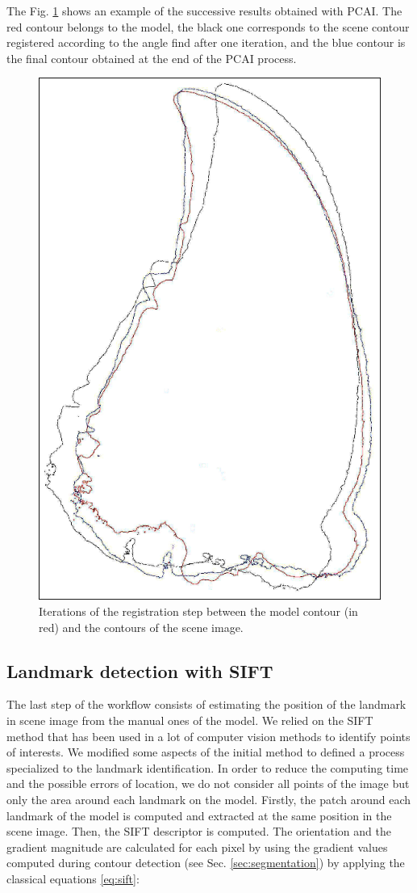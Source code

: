 \documentclass[twoside,twocolumn,10pt]{article}
\begin{document}
The Fig. \ref{fig:box} shows an example of the successive results obtained with PCAI.
The red contour belongs to the model, the black one corresponds to the scene contour registered according to the angle find after one iteration, and the blue contour is the
final contour obtained at the end of the PCAI process.

\begin{figure}[htbp]
    \centering
    \includegraphics[width=.265\textwidth]{./images/imreg}
    \caption{Iterations of the registration step between the model contour (in red) and the contours of the scene image.}
    \label{fig:box}
\end{figure}

\subsection{Landmark detection with SIFT}
\label{sec:sift}

The last step of the workflow consists of estimating the position of the landmark in scene image from the manual ones of the model.
We relied on the SIFT method \cite{lowe2004distinctive} that has been used in a lot of computer vision methods to identify points of interests.
We modified some aspects of the initial method to defined a process specialized to the landmark identification.
In order to reduce the computing time and the possible errors of location, we do not consider all points of the image but only the area around each landmark on the model.
Firstly, the patch around each landmark of the model is computed and extracted at the same position in the scene image.
Then, the SIFT descriptor is computed.
The orientation and the gradient magnitude are calculated for each pixel by using the gradient values computed during contour detection (see Sec. \ref{sec:segmentation}) by applying the classical equations \ref{eq:sift}:
\end{document}
